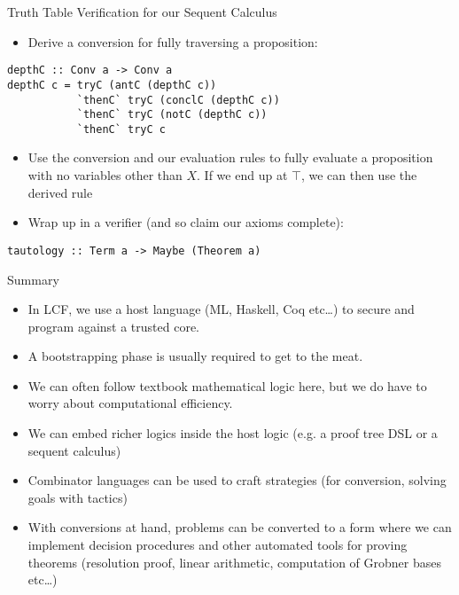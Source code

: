 \documentclass[presentation]{beamer}
\begin{document}
\begin{frame}[fragile,label={sec:orgheadline29}]{Truth Table Verification for our Sequent Calculus}
 \begin{itemize}
\item Derive a conversion for fully traversing a proposition:
\end{itemize}
\begin{verbatim}
depthC :: Conv a -> Conv a
depthC c = tryC (antC (depthC c))
           `thenC` tryC (conclC (depthC c))
           `thenC` tryC (notC (depthC c))
           `thenC` tryC c
\end{verbatim}

\begin{itemize}
\item Use the conversion and our evaluation rules to fully evaluate a proposition with no
variables other than \(X\). If we end up at \(\top\), we can then use the derived rule
\end{itemize}

\begin{prooftree}
\end{prooftree}

\begin{itemize}
\item Wrap up in a verifier (and so claim our axioms complete):
\end{itemize}

\begin{verbatim}
tautology :: Term a -> Maybe (Theorem a)
\end{verbatim}
\end{frame}

\begin{frame}[label={sec:orgheadline30}]{Summary}
\begin{itemize}
\item In LCF, we use a host language (ML, Haskell, Coq etc\ldots{}) to secure and program
against a trusted core.
\item A bootstrapping phase is usually required to get to the meat.
\item We can often follow textbook mathematical logic here, but we do have to worry
about computational efficiency.
\item We can embed richer logics inside the host logic (e.g. a proof tree DSL or a
sequent calculus)
\item Combinator languages can be used to craft strategies (for conversion, solving
goals with tactics)
\item With conversions at hand, problems can be converted to a form where we can
implement decision procedures and other automated tools for proving theorems
(resolution proof, linear arithmetic, computation of Grobner bases etc\ldots{})
\end{itemize}
\end{frame}
\end{document}
